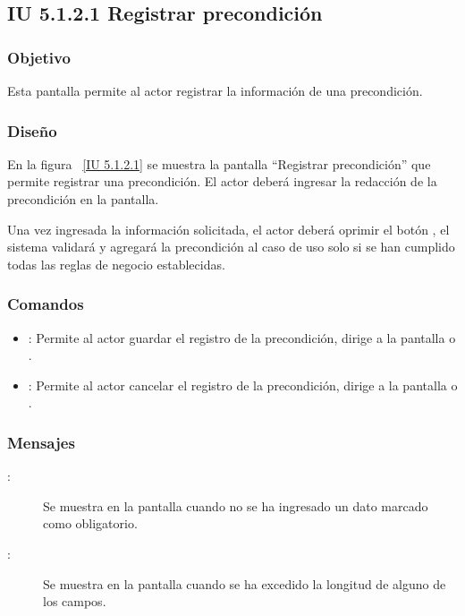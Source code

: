 \newpage 
\subsection{IU 5.1.2.1 Registrar precondición}

\subsubsection{Objetivo}
	
	Esta pantalla permite al actor registrar la información de una precondición.

\subsubsection{Diseño}

    En la figura ~\ref{IU 5.1.2.1} se muestra la pantalla ``Registrar precondición'' que permite registrar una precondición. El actor deberá ingresar la redacción de la precondición en la pantalla.
    
    Una vez ingresada la información solicitada, el actor deberá oprimir el botón , el sistema validará y agregará la precondición al caso de uso
    solo si se han cumplido todas las reglas de negocio establecidas.  \\



\subsubsection{Comandos}
\begin{itemize}
	\item {}: Permite al actor guardar el registro de la precondición, dirige a la pantalla  o .
	\item {}: Permite al actor cancelar el registro de la precondición, dirige a la pantalla  o .
\end{itemize}

\subsubsection{Mensajes}

	
\begin{description}
	\item[ :] Se muestra en la pantalla  cuando no se ha ingresado un dato marcado como obligatorio.
	\item[ :] Se muestra en la pantalla  cuando se ha excedido la longitud de alguno de los campos.
\end{description}
